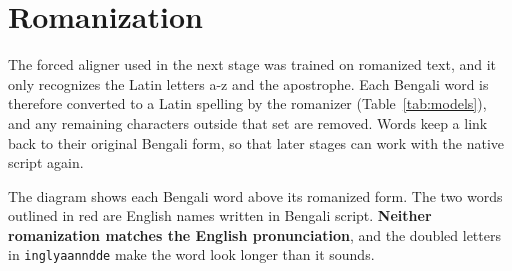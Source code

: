 \section{Romanization}

The forced aligner used in the next stage was trained on romanized text, and it only recognizes the Latin letters a-z and the apostrophe. Each Bengali word is therefore converted to a Latin spelling by the romanizer (Table~\ref{tab:models}), and any remaining characters outside that set are removed. Words keep a link back to their original Bengali form, so that later stages can work with the native script again.

\begin{example}[: romanization]
The diagram shows each Bengali word above its romanized form. The two words outlined in red are English names written in Bengali script. \textbf{Neither romanization matches the English pronunciation}, and the doubled letters in \texttt{inglyaanndde} make the word look longer than it sounds.

\begin{center}

\end{center}
\end{example}
